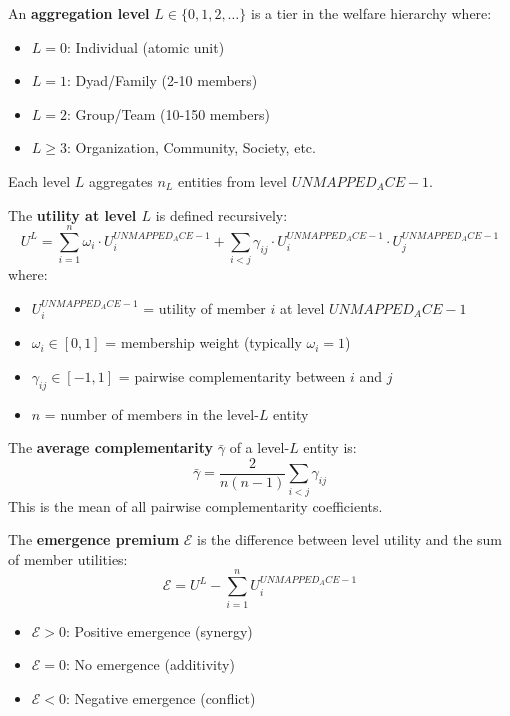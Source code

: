 \begin{definition}
\label{def:level}
An \textbf{aggregation level} $L \in \{0, 1, 2, \ldots\}$ is a tier in the
welfare hierarchy where:
\begin{itemize}[nosep]
\item $L = 0$: Individual (atomic unit)
\item $L = 1$: Dyad/Family (2-10 members)
\item $L = 2$: Group/Team (10-150 members)
\item $L \geq 3$: Organization, Community, Society, etc.
\end{itemize}
Each level $L$ aggregates $n_L$ entities from level $UNMAPPED_ACE-1$.
\end{definition}

\begin{definition}
\label{def:level-utility}
The \textbf{utility at level $L$} is defined recursively:
\begin{equation}
U^L = \sum_{i=1}^{n} \omega_i \cdot U^{UNMAPPED_ACE-1}_i + \sum_{i<j} \gamma_{ij} \cdot U^{UNMAPPED_ACE-1}_i \cdot U^{UNMAPPED_ACE-1}_j
\label{eq:level-utility}
\end{equation}
where:
\begin{itemize}[nosep]
\item $U^{UNMAPPED_ACE-1}_i$ = utility of member $i$ at level $UNMAPPED_ACE-1$
\item $\omega_i \in [0,1]$ = membership weight (typically $\omega_i = 1$)
\item $\gamma_{ij} \in [-1, 1]$ = pairwise complementarity between $i$ and $j$
\item $n$ = number of members in the level-$L$ entity
\end{itemize}
\end{definition}

\begin{definition}
\label{def:avg-gamma}
The \textbf{average complementarity} $\bar{\gamma}$ of a level-$L$ entity is:
\begin{equation}
\bar{\gamma} = \frac{2}{n(n-1)} \sum_{i<j} \gamma_{ij}
\label{eq:avg-gamma}
\end{equation}
This is the mean of all pairwise complementarity coefficients.
\end{definition}

\begin{definition}
\label{def:emergence}
The \textbf{emergence premium} $\mathcal{E}$ is the difference between
level utility and the sum of member utilities:
\begin{equation}
\mathcal{E} = U^L - \sum_{i=1}^{n} U^{UNMAPPED_ACE-1}_i
\label{eq:emergence-def}
\end{equation}
\begin{itemize}[nosep]
\item $\mathcal{E} > 0$: Positive emergence (synergy)
\item $\mathcal{E} = 0$: No emergence (additivity)
\item $\mathcal{E} < 0$: Negative emergence (conflict)
\end{itemize}
\end{definition}


